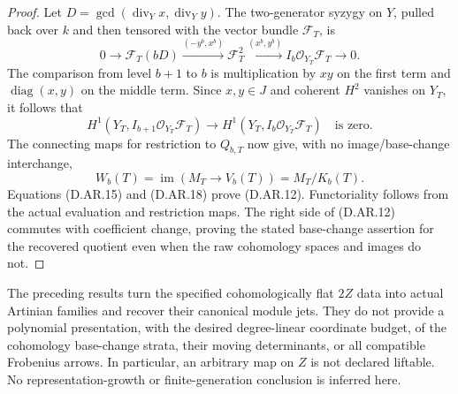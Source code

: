 \begin{proof}
Let $D=\gcd(\operatorname{div}_Yx,\operatorname{div}_Yy)$.
The two-generator syzygy on $Y$, pulled back over $k$ and
then tensored with the vector bundle $\mathcal F_T$, is
\[
 0\longrightarrow\mathcal F_T(bD)
 \xrightarrow{(-y^b,x^b)}\mathcal F_T^2
 \xrightarrow{(x^b,y^b)}
 I_b\mathcal O_{Y_T}\mathcal F_T\longrightarrow0.
                                                        \tag{D.AR.16}
\]
The comparison from level $b+1$ to $b$ is multiplication
by $xy$ on the first term and $\operatorname{diag}(x,y)$
on the middle term. Since $x,y\in J$ and coherent $H^2$
vanishes on $Y_T$, it follows that
\[
 H^1(Y_T,I_{b+1}\mathcal O_{Y_T}\mathcal F_T)
   \longrightarrow H^1(Y_T,I_b\mathcal O_{Y_T}\mathcal F_T)
 \quad\text{is zero}.                                 \tag{D.AR.17}
\]
The connecting maps for restriction to $Q_{b,T}$ now give,
with no image/base-change interchange,
\[
          W_b(T)=\operatorname{im}(M_T\to V_b(T))
                         =M_T/K_b(T).
                                                        \tag{D.AR.18}
\]
Equations (D.AR.15) and (D.AR.18) prove (D.AR.12).
Functoriality follows from the actual evaluation and
restriction maps. The right side of (D.AR.12) commutes
with coefficient change, proving the stated base-change
assertion for the recovered quotient even when the raw
cohomology spaces and images do not.
\end{proof}

\begin{remark}
The preceding results turn the specified cohomologically
flat $2Z$ data into actual Artinian families and recover
their canonical module jets. They do not provide a
polynomial presentation, with the desired degree-linear
coordinate budget, of the cohomology base-change strata,
their moving determinants, or all compatible Frobenius
arrows. In particular, an arbitrary map on $Z$ is not
declared liftable. No representation-growth or
finite-generation conclusion is inferred here.
\end{remark}
